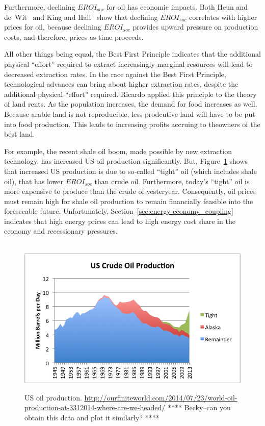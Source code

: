 Furthermore, declining $EROI_{soc}$ for oil has economic impacts.
Both Heun and de~Wit~\cite{Heun:2012ek} and King and Hall~\cite{King:2011go}
show that declining $EROI_{soc}$ correlates with higher prices for oil, 
because declining $EROI_{soc}$ provides upward pressure on 
production costs, and therefore, prices
as time proceeds.

All other things being equal, the Best First Principle
indicates that the additional physical ``effort'' required to extract
increasingly-marginal resources will lead to decreased extraction rates.
In the race against the Best First Principle,
technological advances can bring about higher extraction rates, 
despite the additional physical ``effort'' required. Ricardo applied this 
principle to the theory of land rents. As the  population increases, the demand for 
food increases as well. Because arable land is not reproducible, less prodcutive
 land will have to be put into food production. This leads to increasing profits
 accruing to theowners of
the best land.


For example, the recent shale oil boom, made possible by new extraction technology,
has increased US oil production significantly. 
But, Figure~\ref{fig:US_oil_production} shows that increased US production
is due to so-called ``tight'' oil (which includes shale oil), 
that has lower $EROI_{soc}$ than crude oil.
Furthermore, today's ``tight'' oil is more expensive to produce 
than the crude of yesteryear.
Consequently, oil prices must remain high for 
shale oil production to remain financially feasible into the foreseeable future. 
Unfortunately, Section~\ref{sec:energy-economy_coupling} indicates that
high energy prices can lead to high energy cost share in the economy
and recessionary pressures.

\begin{figure}[!ht]
\centering\
\includegraphics[width=\linewidth]{Part_0/Chapter_Introduction/images/us-crude-oil-production-including-tight-oil.png}
\caption[US oil production]{US oil production.
\url{http://ourfiniteworld.com/2014/07/23/world-oil-production-at-3312014-where-are-we-headed/}
**** Becky--can you obtain this data and plot it similarly? ****
}
\label{fig:US_oil_production}
\end{figure}

